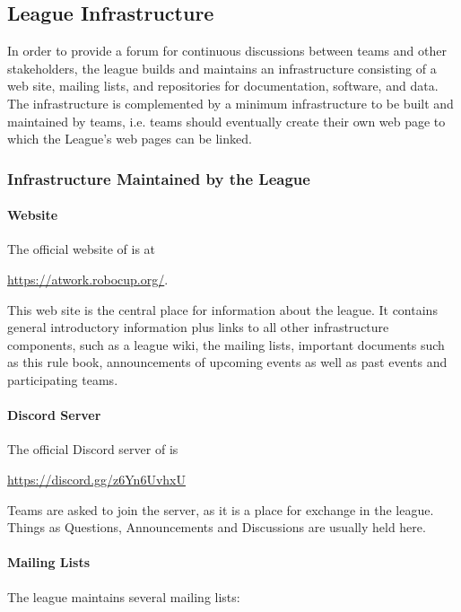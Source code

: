 \subsection{League Infrastructure}
\label{ssec:LeagueInfrastructure}

In order to provide a forum for continuous discussions between teams and other stakeholders, the league builds and maintains an infrastructure consisting of a web site, mailing lists, and repositories for documentation, software, and data. The infrastructure is complemented by a minimum infrastructure to be built and maintained by teams, i.e. teams should eventually create their own web page to which the \RCAW League's web pages can be linked.


\subsubsection{Infrastructure Maintained by the League} 

\paragraph{Website}
The official website of \RCAW is at
\begin{center}
\url{https://atwork.robocup.org/}.
\end{center}

This web site is the central place for information about the league. It contains general introductory information plus links to all other infrastructure components, such as a league wiki, the mailing lists, important documents such as this rule book, announcements of upcoming events as well as past events and participating teams.


\paragraph{Discord Server}
The official Discord server of \RCAW is
\begin{center}
	\href{Official Discord Server}{https://discord.gg/z6Yn6UvhxU}
\end{center}

Teams are asked to join the server, as it is a place for exchange in the league. 
Things as Questions, Announcements and Discussions are usually held here.

\paragraph{Mailing Lists}
The league maintains several mailing lists:

